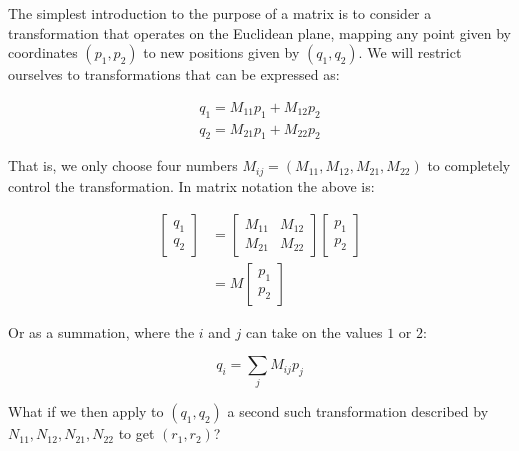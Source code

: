 The simplest introduction to the purpose of a matrix is to consider a transformation that operates on the Euclidean plane, mapping any point given by coordinates $(p_1, p_2)$ to new positions given by $(q_1, q_2)$. We will restrict ourselves to transformations that can be expressed as:

\begin{equation}
\begin{split}
q_1 = M_{11}p_1 + M_{12}p_2 \\
q_2 = M_{21}p_1 + M_{22}p_2
\end{split}
\label{eqn:matrix-multiplication-raw}
\end{equation}

That is, we only choose four numbers $M_{ij} = (M_{11}, M_{12}, M_{21}, M_{22})$ to completely control the transformation. In matrix notation the above is:

\begin{equation}
\begin{split}
\begin{bmatrix}
q_1 \\
q_2
\end{bmatrix}
&=
\begin{bmatrix}
M_{11} & M_{12} \\
M_{21} & M_{22}
\end{bmatrix}
\begin{bmatrix}
p_1 \\
p_2
\end{bmatrix} \\
&=
M
\begin{bmatrix}
p_1 \\
p_2
\end{bmatrix}
\end{split}
\end{equation}

Or as a summation, where the $i$ and $j$ can take on the values $1$ or $2$:

\begin{equation}
q_i = \sum_{j} M_{ij} p_j
\label{eqn:matrix-multiplication-summation}
\end{equation}

What if we then apply to $(q_1, q_2)$ a second such transformation described by $N_{11}, N_{12}, N_{21}, N_{22}$ to get $(r_1, r_2)$? 

